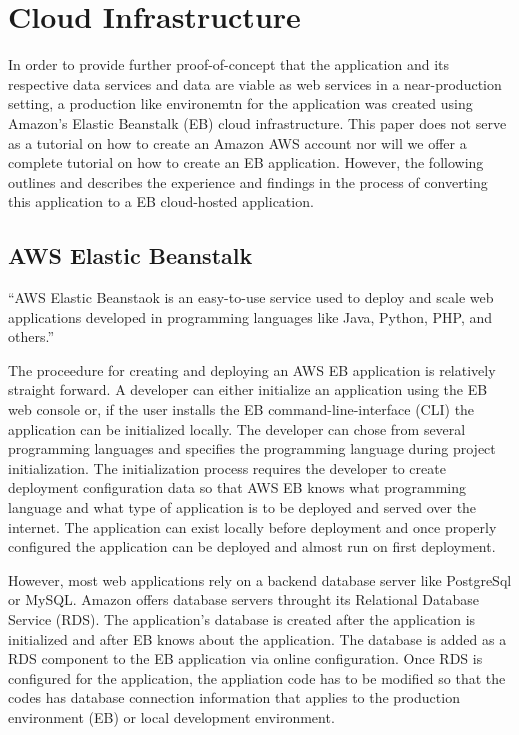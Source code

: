 \section{Cloud Infrastructure}
In order to provide further proof-of-concept that the application and its 
respective data services and data are viable as web services in a 
near-production setting, a production like environemtn for the application 
was created using Amazon's Elastic Beanstalk (EB) cloud infrastructure.  This 
paper does not serve as a tutorial on how to create an Amazon AWS account nor 
will we offer a complete tutorial on how to create an EB application.  
However, the following outlines and describes the experience and findings in 
the process of converting this application to a EB cloud-hosted application.

\subsection{AWS Elastic Beanstalk}
``AWS Elastic Beanstaok is an easy-to-use service used to deploy and scale web 
applications developed in programming languages like Java, Python, PHP, and 
others.''\cite{AWSEB2018}

The proceedure for creating and deploying an AWS EB application is relatively 
straight forward.  A developer can either initialize an application using the 
EB web console or, if the user installs the EB command-line-interface (CLI) 
the application can be initialized locally.  The developer can chose from 
several programming languages and specifies the programming language during 
project initialization.  The initialization process requires the developer to 
create deployment configuration data so that AWS EB knows what programming 
language and what type of application is to be deployed and served over the 
internet.  The application can exist locally before deployment and once 
properly  configured the application can be deployed and almost run on first 
deployment.  

However, most web applications rely on a backend database server like 
PostgreSql or MySQL.  Amazon offers database servers throught its 
Relational Database Service (RDS)\cite{RDS2018}.  The application's 
database is created after the application is initialized and after EB knows 
about the application.  The database is added as a RDS component to the EB 
application via online configuration.  Once RDS is configured for the 
application, the appliation code has to be modified so that the codes has 
database connection information that applies to the production environment 
(EB) or local development environment.

